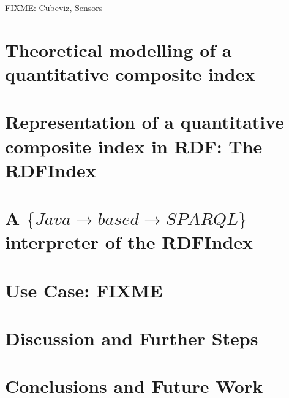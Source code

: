 \documentclass{llncs}
\begin{document}
FIXME: Cubeviz, Sensors

\section{Theoretical modelling of a quantitative composite index}
\section{Representation of a quantitative composite index in RDF: The RDFIndex}
\section{A $\{Java\rightarrow based \rightarrow SPARQL\}$  interpreter of the RDFIndex}
%
\section{Use Case: FIXME}
\section{Discussion and Further Steps}

\section{Conclusions and Future Work}



\end{document}
